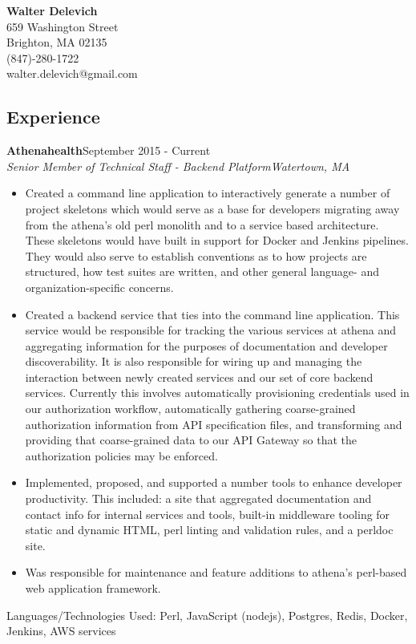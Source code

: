 \documentclass[10pt]{res}
\begin{document}
\thispagestyle{empty} %

\begin{center}
\textbf{\Large{Walter Delevich}}\\
659 Washington Street\\
Brighton, MA 02135\\
(847)-280-1722 \\
walter.delevich@gmail.com
\end{center}

\begin{resume}
  
\section{\large{Experience}}
\vspace{8pt} 
\textbf{Athenahealth}\hfill September 2015 - Current \\
{\sl \small{Senior Member of Technical Staff - Backend Platform\hfill Watertown, MA}} \\
  \begin{itemize} \itemsep -1pt %
    \item Created a command line application to interactively generate a number of project skeletons which would serve as a base for developers migrating away from the athena's old perl monolith and to a service based architecture. These skeletons would have built in support for Docker and Jenkins pipelines. They would also serve to establish conventions as to how projects are structured, how test suites are written, and other general language- and organization-specific concerns.
    \item Created a backend service that ties into the command line application. This service would be responsible for tracking the various services at athena and aggregating information for the purposes of documentation and developer discoverability. It is also responsible for wiring up and managing the interaction between newly created services and our set of core backend services. Currently this involves automatically provisioning credentials used in our authorization workflow, automatically gathering coarse-grained authorization information from API specification files, and transforming and providing that coarse-grained data to our API Gateway so that the authorization policies may be enforced.
    \item Implemented, proposed, and supported a number tools to enhance developer productivity. This included: a site that aggregated documentation and contact info for internal services and tools, built-in middleware tooling for static and dynamic HTML, perl linting and validation rules, and a perldoc site.
    \item Was responsible for maintenance and feature additions to athena's perl-based web application framework.
  \end{itemize} \vspace{-6pt}
\small{Languages/Technologies Used: Perl, JavaScript (nodejs), Postgres, Redis, Docker, Jenkins, AWS services}


\end{resume}
\end{document}
